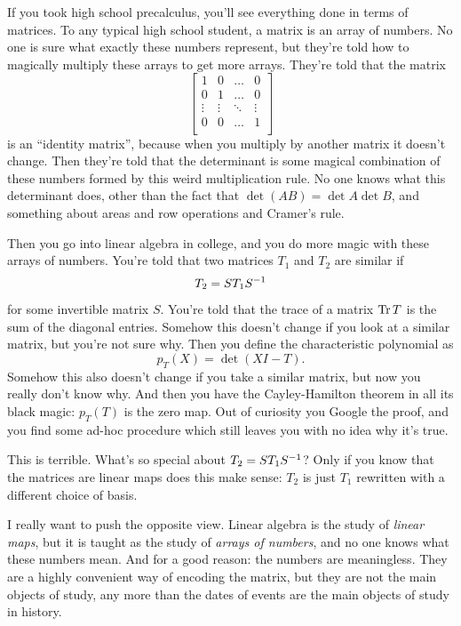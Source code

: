 If you took high school precalculus, you'll see everything done in terms of matrices.
To any typical high school student, a matrix is an array of numbers.
No one is sure what exactly these numbers represent,
but they're told how to magically multiply these arrays to get more arrays.
They're told that the matrix
\[ \begin{bmatrix}
		1 & 0 & \dots & 0 \\
		0 & 1 & \dots & 0 \\
		\vdots & \vdots & \ddots & \vdots \\
		0 & 0 & \dots & 1 \\
	\end{bmatrix} \]
is an ``identity matrix'', because when you multiply
by another matrix it doesn't change.
Then they're told that the determinant is some magical combination of these
numbers formed by this weird multiplication rule.
No one knows what this determinant does,
other than the fact that $\det(AB) = \det A \det B$,
and something about areas and row operations and Cramer's rule.

Then you go into linear algebra in college, and you do more magic
with these arrays of numbers.
You're told that two matrices $T_1$ and $T_2$ are similar if
\[ T_2 = ST_1S^{-1} \] for some invertible matrix $S$.
You're told that the trace of a matrix $\operatorname{Tr} T$ is the sum of the diagonal entries.
Somehow this doesn't change if you look at a similar matrix,
but you're not sure why.
Then you define the characteristic polynomial as
\[ p_T(X) = \det (XI - T). \]
Somehow this also doesn't change if you take a similar matrix,
but now you really don't know why.
And then you have the Cayley-Hamilton theorem in all its black magic:
$p_T(T)$ is the zero map.  Out of curiosity you Google the proof,
and you find some ad-hoc procedure which still leaves you
with no idea why it's true.

This is terrible. What's so special about $T_2 = ST_1S^{-1}$?
Only if you know that the matrices are linear maps does this make sense:
$T_2$ is just $T_1$ rewritten with a different choice of basis.

I really want to push the opposite view.
Linear algebra is the study of \emph{linear maps},
but it is taught as the study of \emph{arrays of numbers},
and no one knows what these numbers mean.
And for a good reason: the numbers are meaningless.
They are a highly convenient way of encoding the matrix,
but they are not the main objects of study,
any more than the dates of events are the main objects of study in history.

